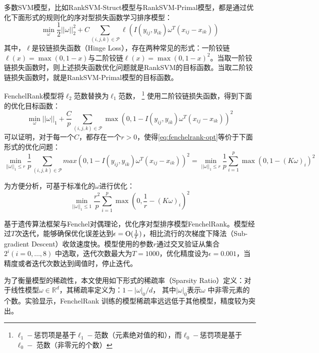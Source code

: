 多数SVM模型，比如RankSVM-Struct模型\cite{joachims2006training}与RankSVM-Primal模型\cite{chapelle2010efficient}，都是通过优化下面形式的规则化的序对型损失函数学习排序模型：
\begin{equation}
  \min\limits_{\omega} \frac{1}{2}||\omega||_2^2 + C\sum\limits_{(i,j,k)\in \mathscr P} \ell(I(y_{ij},y_{ik})\omega^T (x_{ij} - x_{ik}))
\end{equation}
其中，$\ell$是铰链损失函数（Hinge Loss），存在两种常见的形式：一阶铰链$\ell(x) = \max(0, 1-x)$与二阶铰链$\ell(x) = \max(0, 1-x)^2$。当取一阶铰链损失函数时，则上述损失函数优化问题就是RankSVM的目标函数。当取二阶铰链损失函数时，就是RankSVM-Primal模型的目标函数。

FenchelRank模型将$\ell_2$范数替换为$\ell_1$范数，
\footnote{$\ell_1-$惩罚项是基于$\ell_1-$范数（元素绝对值的和），而$\ell_0-$惩罚项是基于$\ell_0-$ 范数（非零元的个数）}
使用二阶铰链损失函数，得到下面的优化目标函数：
\begin{equation}\label{eq:fenchelrank-opt}
  \min\limits_{\omega} ||\omega||_1 + \frac{C}{p}\sum\limits_{(i,j,k)\in \mathscr P} \max(0, 1-I(y_{ij},y_{ik})\omega^T (x_{ij} - x_{ik}))^2
\end{equation}
可以证明，对于每一个$C$，都存在一个$r>0$，使得\eqref{eq:fenchelrank-opt}等价于下面形式的优化问题：
\begin{equation}
  \min\limits_{||\omega||_1\le r } \frac{1}{p}\sum\limits_{(i,j,k)\in \mathscr P} max(0, 1-I(y_{ij},y_{ik})\omega^T (x_{ij} - x_{ik}))^2 = \min\limits_{||\omega||_1\le r } \frac{1}{p}\sum\limits_{i=1}^p \max(0, 1-(K\omega)_i)^2
\end{equation}

为方便分析，可基于标准化的$\omega$进行优化：
\begin{equation}
  \min\limits_{||\omega||_1\le 1 } \frac{r^2}{p}\sum\limits_{i=1}^p \max(0, \frac{1}{r}-(K\omega)_i)^2
\end{equation}

\cite{lai2012sparse}基于遗传算法框架与Fenchel对偶理论，优化序对型排序模型FenchelRank。模型经过$T$次迭代，能够确保优化误差达到$\epsilon = \operatorname{\mathrm{O}}(\frac{1}{T})$，相比流行的次梯度下降法（Sub-gradient Descent）收敛速度快。\cite{lai2012sparse}模型使用的参数$r$通过交叉验证从集合$2^i(i = 0,\ldots, 8)$ 中选取，迭代次数最大为$T = 1000$，优化精度设为$\epsilon = 0.001$，当精度或者迭代次数达到阈值时，停止迭代。

为了衡量模型的稀疏性，本文使用如下形式的稀疏率（Sparsity Ratio）定义：对于线性模型$\omega\in \mathbb R^d$，其稀疏率定义为：$1-|\omega|_0/d$，
其中$|\omega|_0$表示$\omega$ 中非零元素的个数。实验显示，FenchelRank 训练的模型稀疏率远远低于其他模型，精度较为突出。

